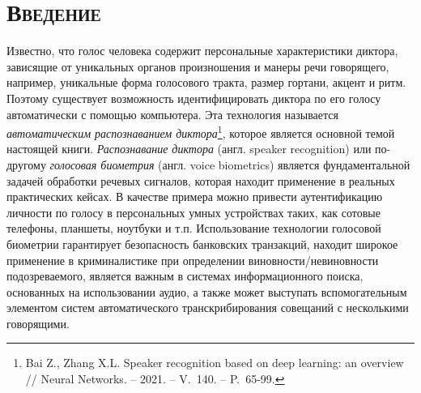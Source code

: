 \documentclass[12pt]{book}
\begin{document}
\chapter{\textsc{Введение}}

\thispagestyle{fancy}

\large{Известно, что голос человека содержит персональные характеристики диктора, зависящие от уникальных органов произношения и манеры речи говорящего, например, уникальные форма голосового тракта, размер гортани, акцент и ритм. Поэтому существует возможность идентифицировать диктора по его голосу автоматически с помощью компьютера. Эта технология называется \textit{автоматическим распознаванием диктора}\footnote{Bai Z., Zhang X.L. Speaker recognition based on deep learning: an overview // Neural Networks. -- 2021. -- V.~140. -- P.~65-99.}, которое является основной темой настоящей книги. \textit{Распознавание диктора} (англ. speaker recognition) или по-другому \textit{голосовая биометрия} (англ. voice biometrics) является фундаментальной задачей обработки речевых сигналов, которая находит применение в реальных практических кейсах. В качестве примера можно привести аутентификацию личности по голосу в персональных умных устройствах таких, как сотовые телефоны, планшеты, ноутбуки и т.п. Использование технологии голосовой биометрии гарантирует безопасность банковских транзакций, находит широкое применение в криминалистике при определении виновности/невиновности подозреваемого, является важным в системах информационного поиска, основанных на использовании аудио, а также может выступать вспомогательным элементом систем автоматического транскрибирования совещаний с несколькими говорящими.}
\end{document}
